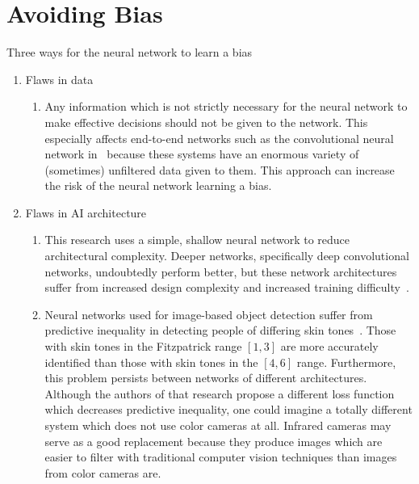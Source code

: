 \documentclass[]{report}
\begin{document}
\FloatBarrier
\section{Avoiding Bias}

Three ways for the neural network to learn a bias
\begin{enumerate}
    \item Flaws in data
    \begin{enumerate}
        \item Any information which is not strictly necessary for the neural network to make
        effective decisions should not be given to the network. This especially affects end-to-end
        networks such as the convolutional neural network in~\cite{bojarski2016end} because these
        systems have an enormous variety of (sometimes) unfiltered data given to them. This approach
        can increase the risk of the neural network learning a bias.
    \end{enumerate}
    
    \item Flaws in AI architecture
    \begin{enumerate}
        \item This research uses a simple, shallow neural network to reduce architectural
        complexity. Deeper networks, specifically deep convolutional networks, undoubtedly perform
        better, but these network architectures suffer from increased design complexity and
        increased training difficulty~\cite{mhaskar2016deep}.

        \item Neural networks used for image-based object detection suffer from predictive
        inequality in detecting people of differing skin tones~\cite{wilson2019predictive}. Those
        with skin tones in the Fitzpatrick range $[1, 3]$ are more accurately identified than those
        with skin tones in the $[4, 6]$ range. Furthermore, this problem persists between networks
        of different architectures. Although the authors of that research propose a different loss
        function which decreases predictive inequality, one could imagine a totally different system
        which does not use color cameras at all. Infrared cameras may serve as a good replacement
        because they produce images which are easier to filter with traditional computer vision
        techniques than images from color cameras are.
    \end{enumerate}
    

\end{enumerate}
\end{document}

